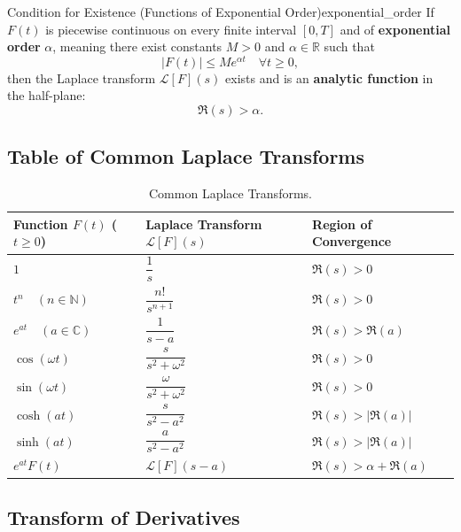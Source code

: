 \begin{proposition}{Condition for Existence (Functions of Exponential Order)}{exponential_order}
If $F(t)$ is piecewise continuous on every finite interval $[0, T]$ and of \textbf{exponential order} $\alpha$, meaning there exist constants $M > 0$ and $\alpha \in \mathbb{R}$ such that
\begin{equation}
|F(t)| \le M e^{\alpha t} \quad \forall t \ge 0,
\end{equation}
then the Laplace transform $\mathcal{L}[F](s)$ exists and is an \textbf{analytic function} in the half-plane:
\begin{equation}
\Re(s) > \alpha.
\end{equation}
\end{proposition}

\subsection{Table of Common Laplace Transforms}

\begin{table}[h!]
\centering
\renewcommand{\arraystretch}{1.5}
\begin{tabular}{|l|l|l|}
\hline
\textbf{Function $F(t)$ ($t \ge 0$)} & \textbf{Laplace Transform $\mathcal{L}[F](s)$} & \textbf{Region of Convergence} \\ \hline
$1$ & $\dfrac{1}{s}$ & $\Re(s) > 0$ \\ \hline
$t^n \quad (n \in \mathbb{N})$ & $\dfrac{n!}{s^{n+1}}$ & $\Re(s) > 0$ \\ \hline
$e^{at} \quad (a \in \mathbb{C})$ & $\dfrac{1}{s - a}$ & $\Re(s) > \Re(a)$ \\ \hline
$\cos(\omega t)$ & $\dfrac{s}{s^2 + \omega^2}$ & $\Re(s) > 0$ \\ \hline
$\sin(\omega t)$ & $\dfrac{\omega}{s^2 + \omega^2}$ & $\Re(s) > 0$ \\ \hline
$\cosh(at)$ & $\dfrac{s}{s^2 - a^2}$ & $\Re(s) > |\Re(a)|$ \\ \hline
$\sinh(at)$ & $\dfrac{a}{s^2 - a^2}$ & $\Re(s) > |\Re(a)|$ \\ \hline
$e^{at} F(t)$ & $\mathcal{L}[F](s - a)$ & $\Re(s) > \alpha + \Re(a)$ \\ \hline
\end{tabular}
\caption{Common Laplace Transforms.}
\end{table}

\subsection{Transform of Derivatives}

